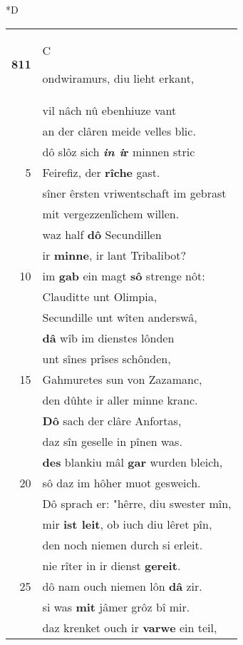 \documentclass[8pt,a4paper,notitlepage]{article}
\begin{document}
\begin{table}[ht]
\begin{minipage}[t]{0.5\linewidth}
\small
\begin{center}*D
\end{center}
\begin{tabular}{rl}
\textbf{811} & \begin{large}C\end{large}ondwiramurs, diu lieht erkant,\\ 
 & vil nâch nû ebenhiuze vant\\ 
 & an der clâren meide velles blic.\\ 
 & dô slôz sich \textbf{\textit{in i}r} minnen stric\\ 
5 & Feirefiz, der \textbf{rîche} gast.\\ 
 & sîner êrsten vriwentschaft im gebrast\\ 
 & mit vergezzenlîchem willen.\\ 
 & waz half \textbf{dô} Secundillen\\ 
 & ir \textbf{minne}, ir lant Tribalibot?\\ 
10 & im \textbf{gab} ein magt \textbf{sô} strenge nôt:\\ 
 & Clauditte unt Olimpia,\\ 
 & Secundille unt wîten anderswâ,\\ 
 & \textbf{dâ} wîb im dienstes lônden\\ 
 & unt sînes prîses schônden,\\ 
15 & Gahmuretes sun von Zazamanc,\\ 
 & den dûhte ir aller minne kranc.\\ 
 & \textbf{Dô} sach der clâre Anfortas,\\ 
 & daz sîn geselle in pînen was.\\ 
 & \textbf{des} blankiu mâl \textbf{gar} wurden bleich,\\ 
20 & sô daz im hôher muot gesweich.\\ 
 & Dô sprach er: "hêrre, diu swester mîn,\\ 
 & mir \textbf{ist leit}, ob iuch diu lêret pîn,\\ 
 & den noch niemen durch si erleit.\\ 
 & nie rîter in ir dienst \textbf{gereit}.\\ 
25 & dô nam ouch niemen lôn \textbf{dâ} zir.\\ 
 & si was \textbf{mit} jâmer grôz bî mir.\\ 
 & daz krenket ouch ir \textbf{varwe} ein teil,\\ 

\end{tabular}
\end{minipage}
\end{table}
\end{document}
